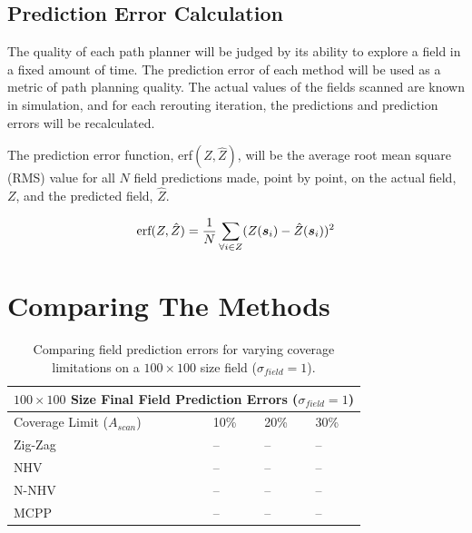 \subsection{Prediction Error Calculation}
The quality of each path planner will be judged by its ability to explore a field in a fixed amount of time. The prediction error of each method will be used as a metric of path planning quality. The actual values of the fields scanned are known in simulation, and for each rerouting iteration, the predictions and prediction errors will be recalculated.

The prediction error function, erf$(Z,\hat{Z})$, will be the average root mean square (RMS) value for all $N$ field predictions made, point by point, on the actual field, $Z$, and the predicted field, $\hat{Z}$.

\begin{equation}
\text{erf}(Z, \hat{Z}) = \frac{1}{N}\sum_{\forall i \in Z} (Z({\it{\boldsymbol{s}}}_i) - \hat{Z}({\it{\boldsymbol{s}}}_i))^2
\end{equation}



\section{Comparing The Methods}

\begin{table}[ht!]
\centering
  \begin{tabular}{ |p{3cm}||p{1cm}|p{1cm}|p{1cm}|  }
      \hline
      \multicolumn{4}{|c|}{$100 \times 100$ Size Final Field Prediction Errors ($\sigma_{field} = 1$)} \\
      \hline
      Coverage Limit ($A_{scan}$) & 10\% & 20\% & 30\% \\
      \hline
      Zig-Zag        & -- & -- & -- \\
      NHV            & -- & -- & -- \\
      N-NHV          & -- & -- & -- \\
      MCPP           & -- & -- & -- \\
      \hline
  \end{tabular}
  \caption{Comparing field prediction errors for varying coverage limitations on a $100 \times 100$ size field ($\sigma_{field} = 1$).}
\end{table}

